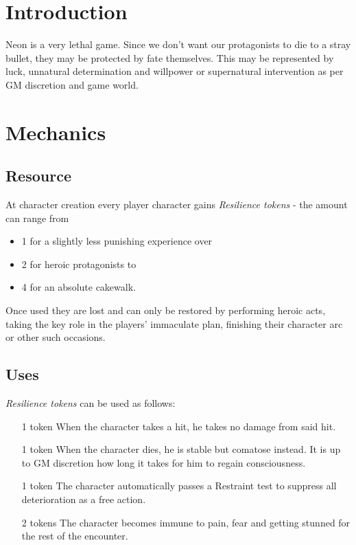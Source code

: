 \documentclass[12pt,a4paper,openany]{book}
\begin{document}
	

	\chapter{Introduction}
	Neon is a very lethal game. Since we don't want our protagonists to die to a stray bullet, they may be protected by fate themselves. This may be represented by luck, unnatural determination and willpower or supernatural intervention as per GM discretion and game world.

	\chapter{Mechanics}
	\section{Resource}
	At character creation every player character gains \emph{Resilience tokens} - the amount can range from
	\begin{itemize}
		\item 1 for a slightly less punishing experience over
		\item 2 for heroic protagonists to
		\item 4 for an absolute cakewalk.
	\end{itemize}
	Once used they are lost and can only be restored by performing heroic acts, taking the key role in the players' immaculate plan, finishing their character arc or other such occasions.

	\section{Uses}
	\emph{Resilience tokens} can be used as follows:
	\begin{itemize}
		\item[1 token] When the character takes a hit, he takes no damage from said hit.
		\item[1 token] When the character dies, he is stable but comatose instead. It is up to GM discretion how long it takes for him to regain consciousness.
		\item[1 token] The character automatically passes a Restraint test to suppress all deterioration as a free action.
		\item[2 tokens] The character becomes immune to pain, fear and getting stunned for the rest of the encounter.
	\end{itemize}
\end{document}
